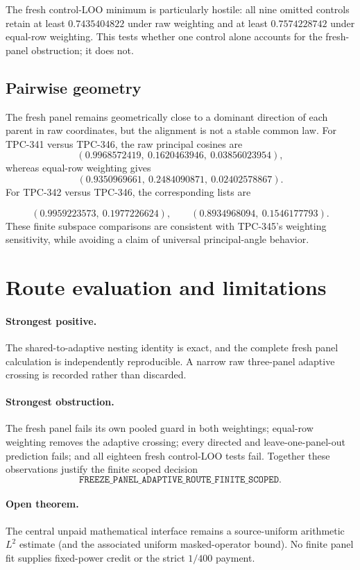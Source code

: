 \documentclass[10pt]{article}
\begin{document}
The fresh control-LOO minimum is particularly hostile: all nine omitted
controls retain at least $0.7435404822$ under raw weighting and at least
$0.7574228742$ under equal-row weighting.  This tests whether one control
alone accounts for the fresh-panel obstruction; it does not.

\subsection{Pairwise geometry}

The fresh panel remains geometrically close to a dominant direction of each
parent in raw coordinates, but the alignment is not a stable common law.
For TPC-341 versus TPC-346, the raw principal cosines are
\[
 (0.9968572419,\ 0.1620463946,\ 0.03856023954),
\]
whereas equal-row weighting gives
\[
 (0.9350969661,\ 0.2484090871,\ 0.02402578867).
\]
For TPC-342 versus TPC-346, the corresponding lists are

\[
 (0.9959223573,\ 0.1977226624),\qquad
 (0.8934968094,\ 0.1546177793).
\]
These finite subspace comparisons are
consistent with TPC-345's weighting sensitivity, while avoiding a claim of
universal principal-angle behavior.

\section{Route evaluation and limitations}

\paragraph{Strongest positive.}
The shared-to-adaptive nesting identity is exact, and the complete fresh
panel calculation is independently reproducible.  A narrow raw
three-panel adaptive crossing is recorded rather than discarded.

\paragraph{Strongest obstruction.}
The fresh panel fails its own pooled guard in both weightings; equal-row
weighting removes the adaptive crossing; every directed and
leave-one-panel-out prediction fails; and all eighteen fresh control-LOO
tests fail.  Together these observations justify the finite scoped decision
\[
\texttt{FREEZE\_PANEL\_ADAPTIVE\_ROUTE\_FINITE\_SCOPED}.
\]

\paragraph{Open theorem.}
The central unpaid mathematical interface remains a source-uniform
arithmetic $L^2$ estimate (and the associated uniform masked-operator
bound).  No finite panel fit supplies fixed-power credit or the strict
$1/400$ payment.
\end{document}
